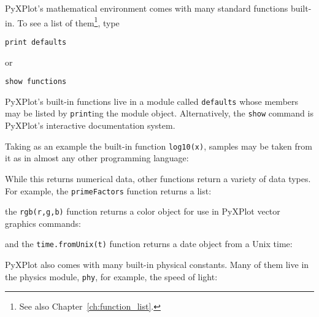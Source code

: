 PyXPlot's mathematical environment comes with many standard functions built-in.
To see a list of them\footnote{See also Chapter~\ref{ch:function_list}.}, type

\begin{verbatim}
print defaults
\end{verbatim}

\noindent or

\begin{verbatim}
show functions
\end{verbatim}

\noindent PyXPlot's built-in functions live in a module called {\tt defaults}
whose members may be listed by {\tt print}ing the module object. Alternatively,
the {\tt show} command is PyXPlot's interactive documentation system.

Taking as an example the built-in function {\tt log10(x)}, samples may be taken
from it as in almost any other programming language:

\vspace{3mm}

\vspace{3mm}

\noindent While this returns numerical data, other functions return a variety
of data types. For example, the {\tt primeFactors} function returns a list:

\vspace{3mm}

\vspace{3mm}

\noindent the {\tt rgb(r,g,b)} function returns a color object for use in
PyXPlot vector graphics commands:

\vspace{3mm}

\vspace{3mm}

\noindent and the {\tt time.fromUnix(t)} function returns a date object from a
Unix time:

\vspace{3mm}

\vspace{3mm}

PyXPlot also comes with many built-in physical constants. Many of them live in
the physics module, {\tt phy}, for example, the speed of light:

\vspace{3mm}

\vspace{3mm}

